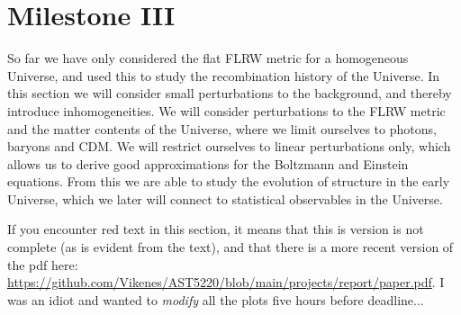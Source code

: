 \section{Milestone III}\label{M3}
So far we have only considered the flat FLRW metric for a homogeneous Universe, and used this to study the recombination history of the Universe. In this section we will consider small perturbations to the background, and thereby introduce inhomogeneities. We will consider perturbations to the FLRW metric and the matter contents of the Universe, where we limit ourselves to photons, baryons and CDM. We will restrict ourselves to linear perturbations only, which allows us to derive good approximations for the Boltzmann and Einstein equations. From this we are able to study the evolution of structure in the early Universe, which we later will connect to statistical observables in the Universe.

If you encounter red text in this section, it means that this is version is not complete (as is evident from the text), and that there is a more recent version of the pdf here: \url{https://github.com/Vikenes/AST5220/blob/main/projects/report/paper.pdf}. I was an idiot and wanted to \textit{modify} all the plots five hours before deadline... 






 